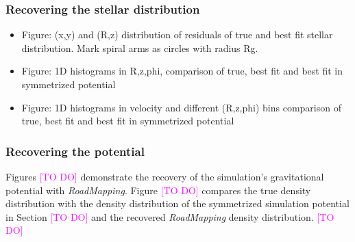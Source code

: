 \documentclass[iop,revtex4,numberedappendix,appendixfloats]{emulateapj}
\newcommand{\RM}{{\sl RoadMapping}}
\newcommand{\Wilma}[1]{\textcolor{Magenta}{#1}}
\begin{document}
\subsubsection{Recovering the stellar distribution}

\begin{itemize}
\item Figure: (x,y) and (R,z) distribution of residuals of true and best fit stellar distribution. Mark spiral arms as circles with radius Rg.
\item Figure: 1D histograms in R,z,phi, comparison of  true, best fit and best fit in symmetrized potential
\item Figure: 1D histograms in velocity and different (R,z,phi) bins comparison of  true, best fit and best fit in symmetrized potential
\end{itemize}

\subsubsection{Recovering the potential}

Figures \Wilma{[TO DO]} demonstrate the recovery of the simulation's gravitational potential with \RM{}. Figure \Wilma{[TO DO]} compares the true density distribution with the density distribution of the symmetrized simulation potential in Section \Wilma{[TO DO]} and the recovered \RM{} density distribution. \Wilma{[TO DO]}
\end{document}
